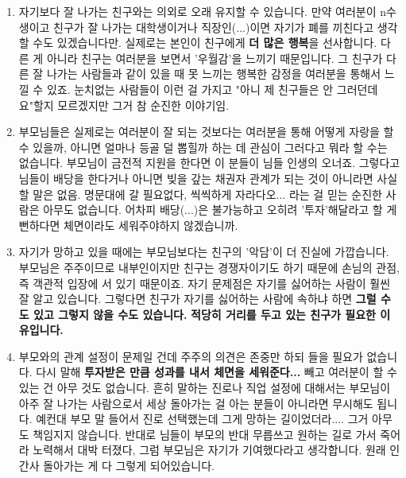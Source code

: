 \vspace{5mm}
\begin{enumerate}

    \item 자기보다 잘 나가는 친구와는 의외로 오래 유지할 수 있습니다.
    만약 여러분이 n수생이고 친구가 잘 나가는 대학생이거나 직장인(...)이면 자기가 폐를 끼친다고 생각할 수도 있겠습니다만.
    실제로는 본인이 친구에게 \textbf{더 많은 행복}을 선사합니다.
    다른 게 아니라 친구는 여러분을 보면서 '우월감'을 느끼기 때문입니다.
    그 친구가 다른 잘 나가는 사람들과 같이 있을 때 못 느끼는 행복한 감정을 여러분을 통해서 느낄 수 있죠.
    눈치없는 사람들이 이런 걸 가지고 "아니 제 친구들은 안 그러던데요"할지 모르겠지만 그거 참 순진한 이야기임.
    \vspace{5mm}

    \item 부모님들은 실제로는 여러분이 잘 되는 것보다는
    여러분을 통해 어떻게 자랑을 할 수 있을까, 아니면 얼마나 등골 덜 뽑힐까 하는 데 관심이
    그러다고 뭐라 할 수는 없습니다. 부모님이 금전적 지원을 한다면 이 분들이 님들 인생의 오너죠.
    그렇다고 님들이 배당을 한다거나 아니면 빚을 갚는 채권자 관계가 되는 것이 아니라면 사실 할 말은 없음.
    명문대에 갈 필요없다, 씩씩하게 자라다오... 라는 걸 믿는 순진한 사람은 아무도 없습니다.
    어차피 배당(...)은 불가능하고 오히려 '투자'해달라고 할 게 뻔하다면 체면이라도 세워주야하지 않겠습니까.
    \vspace{5mm}

    \item 자기가 망하고 있을 때에는 부모님보다는 친구의 '악담'이 더 진실에 가깝습니다.
    부모님은 주주이므로 내부인이지만 친구는 경쟁자이기도 하기 때문에 손님의 관점, 즉 객관적 입장에 서 있기 때문이죠.
    자기 문제점은 자기를 싫어하는 사람이 훨씬 잘 알고 있습니다.
    그렇다면 친구가 자기를 싫어하는 사람에 속하냐 하면 \textbf{그럴 수도 있고 그렇지 않을 수도 있습니다.}
    \textbf{적당히 거리를 두고 있는 친구가 필요한 이유입니다.}
    \vspace{5mm}

    \item 부모와의 관계 설정이 문제일 건데 주주의 의견은 존중만 하되 들을 필요가 없습니다.
    다시 말해 \textbf{투자받은 만큼 성과를 내서 체면을 세워준다...} 빼고 여러분이 할 수 있는 건 아무 것도 없습니다.
    흔히 말하는 진로나 직업 설정에 대해서는 부모님이 아주 잘 나가는 사람으로서 세상 돌아가는 걸 아는 분들이 아니라면 무시해도 됩니다.
    예컨대 부모 말 들어서 진로 선택했는데 그게 망하는 길이었더라.... 그거 아무도 책임지지 않습니다.
    반대로 님들이 부모의 반대 무릅쓰고 원하는 길로 가서 죽어라 노력해서 대박 터졌다, 그럼 부모님은 자기가 기여했다라고 생각합니다.
    원래 인간사 돌아가는 게 다 그렇게 되어있습니다.
    \vspace{5mm}


\end{enumerate}
